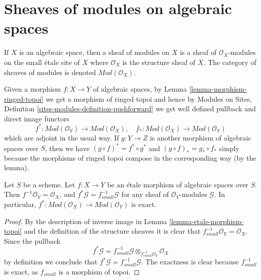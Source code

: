 \section{Sheaves of modules on algebraic spaces}
\label{section-modules}

\noindent
If $X$ is an algebraic space, then a sheaf of modules on $X$ is
a sheaf of $\mathcal{O}_X$-modules on the small \'etale site of $X$
where $\mathcal{O}_X$ is the structure sheaf of $X$. The category
of sheaves of modules is denoted $\textit{Mod}(\mathcal{O}_X)$.

\medskip\noindent
Given a morphism $f : X \to Y$ of algebraic spaces, by
Lemma \ref{lemma-morphism-ringed-topoi}
we get a morphism of ringed topoi and hence by
Modules on Sites, Definition \ref{sites-modules-definition-pushforward}
we get well defined pullback and direct image functors
\begin{equation}
\label{equation-push-pull}
f^* :
\textit{Mod}(\mathcal{O}_Y)
\longrightarrow
\textit{Mod}(\mathcal{O}_X), \quad
f_* :
\textit{Mod}(\mathcal{O}_X)
\longrightarrow
\textit{Mod}(\mathcal{O}_Y)
\end{equation}
which are adjoint in the usual way. If $g : Y \to Z$ is another morphism
of algebraic spaces over $S$, then we have
$(g \circ f)^* = f^* \circ g^*$ and $(g \circ f)_* = g_* \circ f_*$
simply because the morphisms of ringed topoi compose in the corresponding
way (by the lemma).

\begin{lemma}
\label{lemma-etale-exact-pullback}
Let $S$ be a scheme.
Let $f : X \to Y$ be an \'etale morphism of algebraic spaces over $S$.
Then $f^{-1}\mathcal{O}_Y = \mathcal{O}_X$, and
$f^*\mathcal{G} = f_{small}^{-1}\mathcal{G}$ for any sheaf of
$\mathcal{O}_Y$-modules $\mathcal{G}$. In particular,
$f^* : \textit{Mod}(\mathcal{O}_X) \to \textit{Mod}(\mathcal{O}_Y)$
is exact.
\end{lemma}

\begin{proof}
By the description of inverse image in Lemma \ref{lemma-etale-morphism-topoi}
and the definition of the structure sheaves it is clear that
$f_{small}^{-1}\mathcal{O}_Y = \mathcal{O}_X$. Since the pullback
$$
f^*\mathcal{G} =
f_{small}^{-1}\mathcal{G} \otimes_{f_{small}^{-1}\mathcal{O}_Y}
\mathcal{O}_X
$$
by definition we conclude that $f^*\mathcal{G} = f_{small}^{-1}\mathcal{G}$.
The exactness is clear because $f_{small}^{-1}$ is exact, as $f_{small}$
is a morphism of topoi.
\end{proof}

